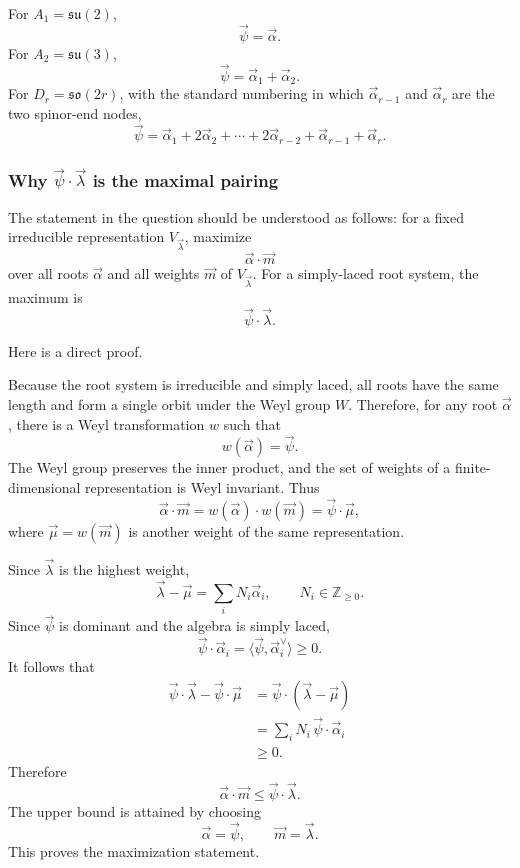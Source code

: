 \documentclass[
  10pt,
  a4paper,
  openany]{book}
\begin{document}
For \(A_1=\mathfrak{su}(2)\), \[
\vec\psi=\vec\alpha.
\] For \(A_2=\mathfrak{su}(3)\), \[
\vec\psi=\vec\alpha_1+\vec\alpha_2.
\] For \(D_r=\mathfrak{so}(2r)\), with the standard numbering in which
\(\vec\alpha_{r-1}\) and \(\vec\alpha_r\) are the two spinor-end nodes,
\[
\vec\psi
=\vec\alpha_1
+2\vec\alpha_2
+\cdots
+2\vec\alpha_{r-2}
+\vec\alpha_{r-1}
+\vec\alpha_r.
\]

\subsubsection{\texorpdfstring{Why \(\vec\psi\cdot\vec\lambda\) is the
maximal
pairing}{Why \textbackslash vec\textbackslash psi\textbackslash cdot\textbackslash vec\textbackslash lambda is the maximal pairing}}\label{why-vecpsicdotveclambda-is-the-maximal-pairing}

The statement in the question should be understood as follows: for a
fixed irreducible representation \(V_{\vec\lambda}\), maximize \[
\vec\alpha\cdot\vec m
\] over all roots \(\vec\alpha\) and all weights \(\vec m\) of
\(V_{\vec\lambda}\). For a simply-laced root system, the maximum is \[
\vec\psi\cdot\vec\lambda.
\]

Here is a direct proof.

Because the root system is irreducible and simply laced, all roots have
the same length and form a single orbit under the Weyl group \(W\).
Therefore, for any root \(\vec\alpha\), there is a Weyl transformation
\(w\) such that \[
w(\vec\alpha)=\vec\psi.
\] The Weyl group preserves the inner product, and the set of weights of
a finite-dimensional representation is Weyl invariant. Thus \[
\vec\alpha\cdot\vec m
=w(\vec\alpha)\cdot w(\vec m)
=\vec\psi\cdot\vec\mu,
\] where \(\vec\mu=w(\vec m)\) is another weight of the same
representation.

Since \(\vec\lambda\) is the highest weight, \[
\vec\lambda-\vec\mu
=\sum_i N_i\vec\alpha_i,
\qquad
N_i\in\mathbb Z_{\geq0}.
\] Since \(\vec\psi\) is dominant and the algebra is simply laced, \[
\vec\psi\cdot\vec\alpha_i
=\langle\vec\psi,\vec\alpha_i^{\vee}\rangle
\geq0.
\] It follows that \[
\begin{aligned}
\vec\psi\cdot\vec\lambda
-\vec\psi\cdot\vec\mu
&=\vec\psi\cdot(\vec\lambda-\vec\mu)\\
&=\sum_iN_i\,\vec\psi\cdot\vec\alpha_i\\
&\geq0.
\end{aligned}
\] Therefore \[
\vec\alpha\cdot\vec m
\leq\vec\psi\cdot\vec\lambda.
\] The upper bound is attained by choosing \[
\vec\alpha=\vec\psi,
\qquad
\vec m=\vec\lambda.
\] This proves the maximization statement.
\end{document}
